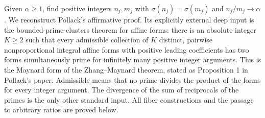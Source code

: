 Given $\alpha\ge1$, find positive integers $n_j,m_j$ with $\sigma(n_j)=\sigma(m_j)$ and $n_j/m_j\to\alpha$. We reconstruct Pollack's affirmative proof. Its explicitly external deep input is the bounded-prime-clusters theorem for affine forms: there is an absolute integer $K\ge2$ such that every admissible collection of $K$ distinct, pairwise nonproportional integral affine forms with positive leading coefficients has two forms simultaneously prime for infinitely many positive integer arguments. This is the Maynard form of the Zhang--Maynard theorem, stated as Proposition 1 in Pollack's paper. Admissible means that no prime divides the product of the forms for every integer argument.
The divergence of the sum of reciprocals of the primes is the only other standard input. All fiber constructions and the passage to arbitrary ratios are proved below.
